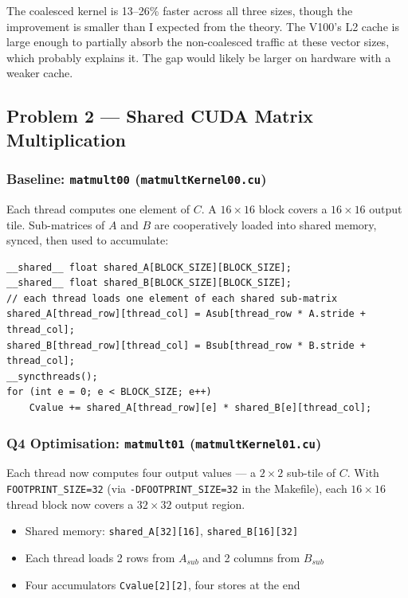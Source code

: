 \documentclass[11pt,letterpaper]{article}
\begin{document}
The coalesced kernel is 13--26\% faster across all three sizes, though the
improvement is smaller than I expected from the theory. The V100's L2 cache is
large enough to partially absorb the non-coalesced traffic at these vector sizes,
which probably explains it. The gap would likely be larger on hardware with a
weaker cache.

\subsection{Problem 2 --- Shared CUDA Matrix Multiplication}

\subsubsection{Baseline: \texttt{matmult00} (\texttt{matmultKernel00.cu})}

Each thread computes one element of $C$. A $16\times16$ block covers a $16\times16$
output tile. Sub-matrices of $A$ and $B$ are cooperatively loaded into shared
memory, synced, then used to accumulate:

\begin{lstlisting}[caption={Baseline matmul --- one C value per thread}]
__shared__ float shared_A[BLOCK_SIZE][BLOCK_SIZE];
__shared__ float shared_B[BLOCK_SIZE][BLOCK_SIZE];
// each thread loads one element of each shared sub-matrix
shared_A[thread_row][thread_col] = Asub[thread_row * A.stride + thread_col];
shared_B[thread_row][thread_col] = Bsub[thread_row * B.stride + thread_col];
__syncthreads();
for (int e = 0; e < BLOCK_SIZE; e++)
    Cvalue += shared_A[thread_row][e] * shared_B[e][thread_col];
\end{lstlisting}

\subsubsection{Q4 Optimisation: \texttt{matmult01} (\texttt{matmultKernel01.cu})}

Each thread now computes four output values --- a $2\times2$ sub-tile of $C$. With
\texttt{FOOTPRINT\_SIZE=32} (via \texttt{-DFOOTPRINT\_SIZE=32} in the Makefile),
each $16\times16$ thread block now covers a $32\times32$ output region.

\begin{itemize}
  \item Shared memory: \texttt{shared\_A[32][16]}, \texttt{shared\_B[16][32]}
  \item Each thread loads 2 rows from $A_{sub}$ and 2 columns from $B_{sub}$
  \item Four accumulators \texttt{Cvalue[2][2]}, four stores at the end
\end{itemize}
\end{document}
